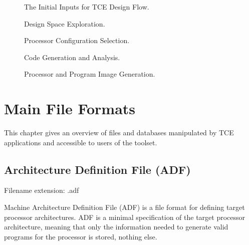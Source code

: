 \documentclass[twoside]{tceusermanual}
\begin{document}
\begin{figure}[p]
\centerline{}
\caption{The Initial Inputs for TCE Design Flow.}
\label{fig:design_flow_initial}
\end{figure}

\begin{figure}[p]
\centerline{}
\caption{Design Space Exploration.}
\label{fig:design_flow_exploration}
\end{figure}

\begin{figure}[p]
\centerline{}
\caption{Processor Configuration Selection.}
\label{fig:design_flow_selection}
\end{figure}

\begin{figure}[p]
\centerline{}
\caption{Code Generation and Analysis.}
\label{fig:design_flow_codegen}
\end{figure}

\begin{figure}[p]
\centerline{}
\caption{Processor and Program Image Generation.}
\label{fig:design_flow_generation}
\end{figure}


\section{Main File Formats}
\label{section:fileFormats}

This chapter gives an overview of files and databases manipulated by TCE
applications and accessible to users of the toolset.  

\subsection{Architecture Definition File (ADF)}
\label{sec:adf}

Filename extension: .adf

Machine Architecture Definition File (ADF) is a file format
for defining target processor architectures.  ADF is a minimal specification
of the target processor architecture, meaning that only the information
needed  to generate valid programs for the processor is stored, nothing
else. 
\end{document}
